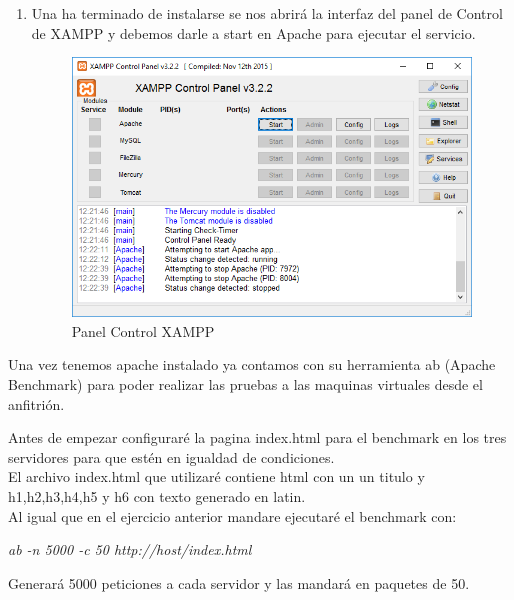\begin{enumerate}
	\item Una ha terminado de instalarse se nos abrirá la interfaz del panel de Control de XAMPP y debemos darle a start en Apache para ejecutar el servicio.
	
	\begin{figure}[H] %
		\centering
		\includegraphics[scale=0.4]{pics/xampp7}  %
		\caption{Panel Control XAMPP} \label{fig:XAMP7}
	\end{figure}
	
\end{enumerate}

Una vez tenemos apache instalado ya contamos con su herramienta ab (Apache Benchmark) para poder realizar las pruebas a las maquinas virtuales desde el anfitrión.

Antes de empezar configuraré la pagina index.html para el benchmark en los tres servidores para que estén en igualdad de condiciones.\\
El archivo index.html que utilizaré contiene html con un un titulo y h1,h2,h3,h4,h5 y h6 con texto generado en latin.\\

Al igual que en el ejercicio anterior mandare ejecutaré el benchmark con:\\

\begin{center}
	\textit{ab -n 5000 -c 50 http://host/index.html }
\end{center}

Generará 5000 peticiones a cada servidor y las mandará en paquetes de 50.

